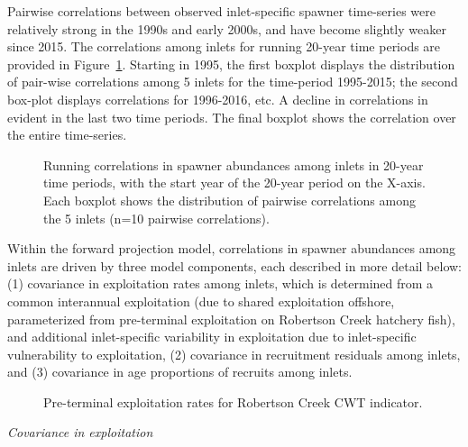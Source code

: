 \documentclass[11pt]{book}
\begin{document}
Pairwise correlations between observed inlet-specific spawner time-series were relatively strong in the 1990s and early 2000s, and have become slightly weaker since 2015. The correlations among inlets for running 20-year time periods are provided in Figure~\ref{fig:chinook-RunningCorrelations}. Starting in 1995, the first boxplot displays the distribution of pair-wise correlations among 5 inlets for the time-period 1995-2015; the second box-plot displays correlations for 1996-2016, etc. A decline in correlations in evident in the last two time periods. The final boxplot shows the correlation over the entire time-series.
\begin{figure}[htb]

{\centering {} 

}

\caption{Running correlations in spawner abundances among inlets in 20-year time periods, with the start year of the 20-year period on the X-axis. Each boxplot shows the distribution of pairwise correlations among the 5 inlets (n=10 pairwise correlations).}\label{fig:chinook-RunningCorrelations}
\end{figure}
Within the forward projection model, correlations in spawner abundances among inlets are driven by three model components, each described in more detail below: (1) covariance in exploitation rates among inlets, which is determined from a common interannual exploitation (due to shared exploitation offshore, parameterized from pre-terminal exploitation on Robertson Creek hatchery fish), and additional inlet-specific variability in exploitation due to inlet-specific vulnerability to exploitation, (2) covariance in recruitment residuals among inlets, and (3) covariance in age proportions of recruits among inlets.
\begin{figure}[htb]

{\centering {} 

}

\caption{Pre-terminal exploitation rates for Robertson Creek CWT indicator.}\label{fig:chinook-ER}
\end{figure}
\emph{Covariance in exploitation}
\end{document}
